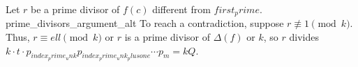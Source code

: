 Let $r$ be a prime divisor of $f(c)$ different from ${first_prime}$. {prime_divisors_argument_alt} To reach a contradiction, suppose $r\not\equiv 1\pmod{{k}}$. Thus, $r\equiv {ell}\pmod{{k}}$ or $r$ is a prime divisor of $\Delta(f)$ or ${k}$, so $r$ divides ${k}\cdot t\cdot p_{{index_prime_unk}}p_{{index_prime_unk_plusone}}\cdots p_m={k}Q$.